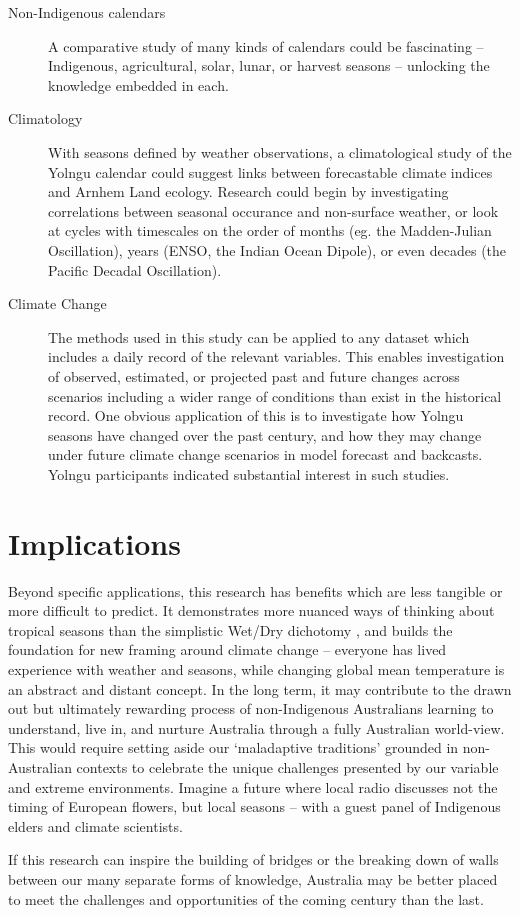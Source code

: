 \begin{description}
\item[Non-Indigenous calendars]
    A comparative study of many kinds of calendars could be fascinating --
    Indigenous, agricultural, solar, lunar, or harvest seasons -- unlocking
    the knowledge embedded in each.

\item[Climatology]
    With seasons defined by weather observations, a climatological study of the
    Yolngu calendar could suggest links between forecastable climate indices
    and Arnhem Land ecology.  Research could begin by investigating correlations
    between seasonal occurance and non-surface weather, or look at cycles with
    timescales on the order of months (eg. the Madden-Julian Oscillation), years (ENSO,
    the Indian Ocean Dipole), or even decades (the Pacific Decadal Oscillation).

\item[Climate Change]
    The methods used in this study can be applied to any dataset which
    includes a daily record of the relevant variables.  This enables
    investigation of observed, estimated, or projected past and future changes
    across scenarios including a wider range of conditions than exist in the historical record.
    One obvious application of this is to investigate how Yolngu seasons have
    changed over the past century, and how they may change under future climate
    change scenarios in model forecast and backcasts.  Yolngu participants
    indicated substantial interest in such studies.
\end{description}


\clearpage
\section{Implications}

Beyond specific applications, this research has benefits which are less
tangible or more difficult to predict.
It demonstrates more nuanced ways of thinking about tropical seasons than the
simplistic Wet/Dry dichotomy \citep{willmett2009}, and builds the foundation
for new framing around climate change -- everyone has lived experience with
weather and seasons, while changing global mean temperature is an abstract and
distant concept.
%
In the long term, it may contribute to the drawn out but ultimately rewarding process of
non-Indigenous Australians learning to understand, live in, and nurture
Australia through a fully Australian world-view.  This would require setting
aside our `maladaptive traditions' grounded in non-Australian contexts
\citep{flannery1994} to celebrate the unique challenges presented by our variable and extreme
environments.  Imagine a future where local radio discusses not the timing of
European flowers, but local seasons -- with a guest panel of Indigenous elders and
climate scientists.

If this research can inspire the building of bridges or the breaking down of walls
between our many separate forms of knowledge, Australia may be better placed
to meet the challenges and opportunities of the coming century than the last.

